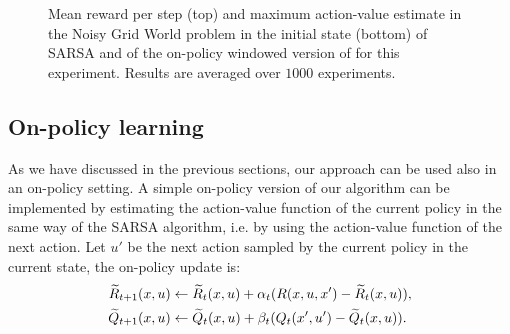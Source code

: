 \documentclass[conference]{IEEEtran}
\begin{document}
\begin{figure}[t]
\begin{minipage}{\columnwidth}
\end{minipage}
  \caption{Mean reward per step (top) and maximum action-value estimate in the Noisy Grid World problem in the initial state (bottom) of SARSA and of the on-policy windowed version of \alg for this experiment. Results are averaged over $1000$ experiments.}
  \label{F:sarsa}
\end{figure}

\subsection{On-policy learning}
As we have discussed in the previous sections, our approach can be used also in an on-policy setting. A simple on-policy version of our algorithm can be implemented by estimating the action-value function of the current policy in the same way of the SARSA algorithm, i.e. by using the action-value function of the next action. Let $u'$ be the next action sampled by the current policy in the current state, the on-policy update is:
\begin{align*}
\widetilde{R}_{t+1}(x,u) & \leftarrow\widetilde{R}_t(x,u)+\alpha_t(R(x,u,x')-\widetilde{R}_t(x,u)),\\
\widetilde{Q}_{t+1}(x,u) & \leftarrow\widetilde{Q}_t(x,u)+\beta_t(Q_t(x',u')-\widetilde{Q}_t(x,u)).
\end{align*}
\end{document}
